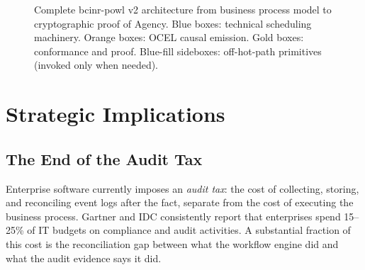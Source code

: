 \documentclass[12pt,a4paper]{article}
\theoremstyle{definition}
\theoremstyle{remark}
\newcommand{\Ostar}{\mathcal{O}^{*}}
\newcommand{\Agency}{\mathcal{A}}
\newcommand{\Reality}{\mathcal{R}}
\begin{document}
\begin{figure}[h]
\caption{Complete bcinr-powl v2 architecture from business process model to cryptographic
proof of Agency.
Blue boxes: technical scheduling machinery.
Orange boxes: OCEL causal emission.
Gold boxes: conformance and proof.
Blue-fill sideboxes: off-hot-path primitives (invoked only when needed).}
\label{fig:arch}
\end{figure}

\section{Strategic Implications}
\label{sec:strategy}

\subsection{The End of the Audit Tax}

Enterprise software currently imposes an \emph{audit tax}: the cost of collecting,
storing, and reconciling event logs after the fact, separate from the cost of
executing the business process.
Gartner and IDC consistently report that enterprises spend 15--25\% of IT budgets
on compliance and audit activities.
A substantial fraction of this cost is the reconciliation gap between what
the workflow engine did and what the audit evidence says it did.
\end{document}
